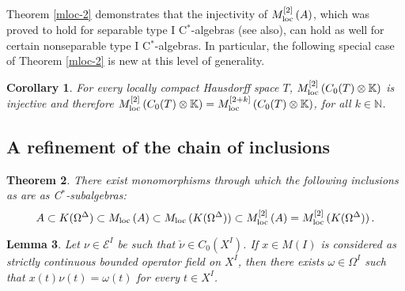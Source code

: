 \documentclass{amsart}
\newtheorem{theorem}{Theorem}[section]
\newtheorem{lemma}[theorem]{Lemma}
\newtheorem{corollary}[theorem]{Corollary}
\theoremstyle{definition}
\theoremstyle{remark}
\begin{document}
 Theorem \ref{mloc-2} demonstrates that the injectivity of ${M_{\rm loc}^{[2]}\,}(A)$, which was proved to hold for separable type I C$^*$-algebras
 \cite[Theorem 2.7]{somerset2000} (see \cite[Theorem 3.2]{ara-mathieu2010} also), can hold as well for certain nonseparable type I C$^*$-algebras.
 In particular, the following special case of Theorem \ref{mloc-2} is new at this level of generality.

 \begin{corollary} \label{C_0(T)} For every  locally compact Hausdorff space $T$,  ${M_{\rm loc}^{[2]}\,}(C_0(T)\otimes\mathbb K)$ is injective and therefore
 ${M_{\rm loc}^{[2]}\,}(C_0(T)\otimes\mathbb K)={M_{\rm loc}^{[2+k]}\,}(C_0(T)\otimes\mathbb K)$, for all $k\in\mathbb N$.
 \end{corollary}

\subsection{A refinement of the chain of inclusions}
 
\begin{theorem}\label{mloc to ie1}
There exist monomorphisms through which the following inclusions as are as C$^*$-subalgebras:
\[
A\subset K(\Omega^\Delta)\subset {M_{\rm loc}\,}(A)\subset {M_{\rm loc}\,}(K(\Omega^\Delta))\subset {M_{\rm loc}^{[2]}\,}(A)={M_{\rm loc}^{[2]}\,}(K(\Omega^\Delta))\,.
\]
\end{theorem}
\begin{lemma}\label{*-str cont} Let $\nu\in \mathcal E^I$ be such that $\check{\nu}\in C_0(X^I)$. If
$x\in M(I)$ is considered as strictly continuous bounded operator field on $X^I$, then there exists
$\omega\in\Omega^I$ such that $x(t)\nu(t)=\omega(t)$ for every $t\in X^I$.
\end{lemma}
\end{document}
